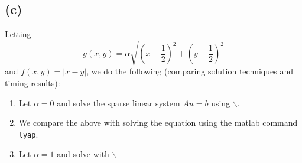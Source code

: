\subsection*{(c)}
Letting  
\begin{equation}
g(x,y) = \alpha\sqrt{(x-\frac{1}{2})^2+(y-\frac{1}{2})^2}
\end{equation}
and $f(x,y)= |x-y|$, we do the following (comparing solution techniques and timing results):
\begin{enumerate}
\item Let $\alpha = 0$ and solve the sparse linear system $Au = b$ using $\backslash$. 
\item We compare the above with solving the equation using the matlab command \texttt{lyap}.
\item Let $\alpha = 1$ and solve with $\backslash$


\end{enumerate}
